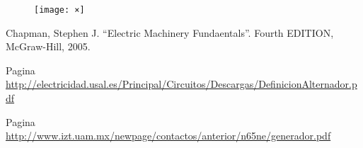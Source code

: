 \documentclass[11pt]{article}
\begin{document}
\begin{figure}
 \texttt{[image: ×]}
\end{figure}



\begin{thebibliography}{99}

 Chapman, Stephen J. ``Electric Machinery Fundaentals''. Fourth EDITION, McGraw-Hill, 2005.

 Pagina \url{http://electricidad.usal.es/Principal/Circuitos/Descargas/DefinicionAlternador.pdf}

 Pagina \url{http://www.izt.uam.mx/newpage/contactos/anterior/n65ne/generador.pdf}

\end{thebibliography}
\end{document}
